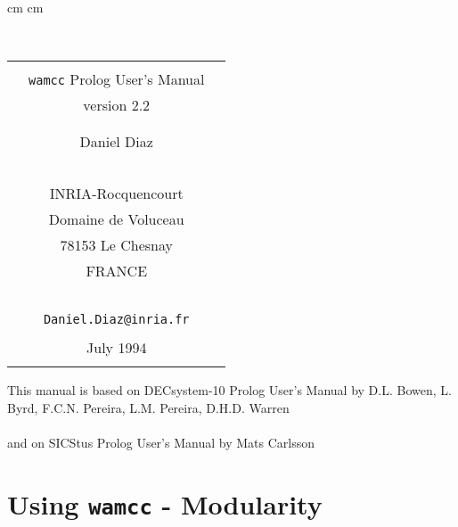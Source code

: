 \def\wamcc{\tt wamcc}
\def\gcc  {\tt gcc}
\def\wgcc {\tt w\_gcc}
\def\bmf  {\tt bmf\_wamcc}


\def\Tild {{\tt \~{ }}}

 cm
 cm
\pagestyle{empty}



\parindent 0pt

~\\
\vspace{1cm}

\Large

\begin{center}

\begin{tabular}{||c||}
\hline
\\
{\Huge  ~~{\wamcc} Prolog User's Manual~~}\\
version 2.2 \\
 \\
 \\
Daniel Diaz\\
 ~\\
INRIA-Rocquencourt\\
Domaine de Voluceau\\
78153 Le Chesnay\\
FRANCE\\
~\\
{\tt Daniel.Diaz@inria.fr} \\
\\
July 1994 \\
 \\
\hline
\end{tabular}

\vspace{5cm}

\large
This manual is based on DECsystem-10 Prolog User's Manual by 
D.L. Bowen, L. Byrd, F.C.N. Pereira, 
L.M. Pereira, D.H.D. Warren \\
~\\
and on SICStus Prolog User's Manual by Mats Carlsson 

\end{center}

\newpage

\normalsize

\tableofcontents

\newpage
\setcounter{page}{1}
\pagestyle{plain}

\section{Using {\wamcc} - Modularity}
\label{modularity}

